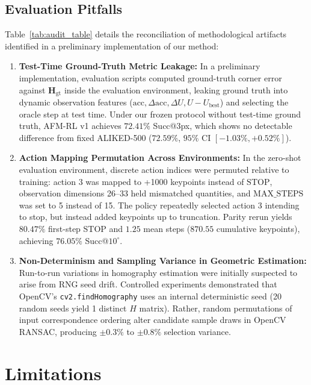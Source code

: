 \documentclass[conference]{IEEEtran}
\begin{document}
\subsection{Evaluation Pitfalls}
Table~\ref{tab:audit_table} details the reconciliation of methodological artifacts identified in a preliminary implementation of our method:
\begin{enumerate}
    \item \textbf{Test-Time Ground-Truth Metric Leakage:} In a preliminary implementation, evaluation scripts computed ground-truth corner error against $\mathbf{H}_{\text{gt}}$ inside the evaluation environment, leaking ground truth into dynamic observation features ($\text{acc}, \Delta\text{acc}, \Delta U, U - U_{\text{best}}$) and selecting the oracle step at test time. Under our frozen protocol without test-time ground truth, AFM-RL v1 achieves $72.41\%$ Succ@3px, which shows no detectable difference from fixed ALIKED-500 ($72.59\%$, $95\%$ CI $[-1.03\%, +0.52\%]$).
    \item \textbf{Action Mapping Permutation Across Environments:} In the zero-shot evaluation environment, discrete action indices were permuted relative to training: action 3 was mapped to +1000 keypoints instead of $\mathrm{STOP}$, observation dimensions 26--33 held mismatched quantities, and $\text{MAX\_STEPS}$ was set to 5 instead of 15. The policy repeatedly selected action 3 intending to stop, but instead added keypoints up to truncation. Parity rerun yields $80.47\%$ first-step STOP and $1.25$ mean steps ($870.55$ cumulative keypoints), achieving $76.05\%$ Succ@$10^\circ$.
    \item \textbf{Non-Determinism and Sampling Variance in Geometric Estimation:} Run-to-run variations in homography estimation were initially suspected to arise from RNG seed drift. Controlled experiments demonstrated that OpenCV's \texttt{cv2.findHomography} uses an internal deterministic seed (20 random seeds yield 1 distinct $H$ matrix). Rather, random permutations of input correspondence ordering alter candidate sample draws in OpenCV RANSAC, producing $\pm 0.3\%$ to $\pm 0.8\%$ selection variance.
\end{enumerate}

\section{Limitations}
\label{sec:limitations}
\end{document}
